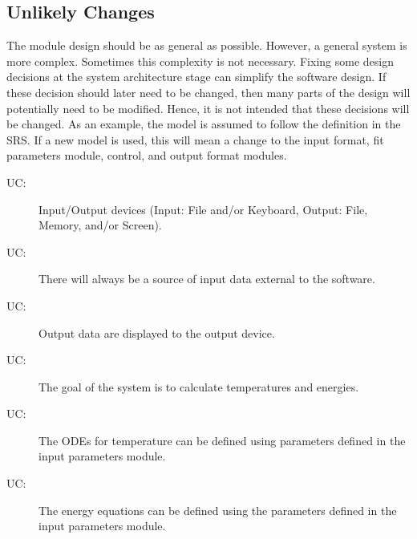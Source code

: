 \documentclass[12pt]{article}
\newcounter{ucnum}
\newcommand{\uctheucnum}{UC\theucnum}
\begin{document}
\subsection{Unlikely Changes}
\label{Sec:UnliChan}
The module design should be as general as possible. However, a general system is more complex. Sometimes this complexity is not necessary. Fixing some design decisions at the system architecture stage can simplify the software design. If these decision should later need to be changed, then many parts of the design will potentially need to be modified. Hence, it is not intended that these decisions will be changed.  As an example, the model is assumed to follow the definition in the SRS.  If a new model is used, this will mean a change to the input format, fit parameters module, control, and output format modules.
\begin{description}
\item[\uctheucnum\label{UCIO}:]Input/Output devices (Input: File and/or Keyboard, Output: File, Memory, and/or Screen).
\end{description}
\begin{description}
\item[\uctheucnum\label{UCinputsource}:]There will always be a source of input data external to the software.
\end{description}
\begin{description}
\item[\uctheucnum\label{UCoutput}:]Output data are displayed to the output device.
\end{description}
\begin{description}
\item[\uctheucnum\label{UCgoal}:]The goal of the system is to calculate temperatures and energies.
\end{description}
\begin{description}
\item[\uctheucnum\label{UCodes}:]The ODEs for temperature can be defined using parameters defined in the input parameters module.
\end{description}
\begin{description}
\item[\uctheucnum\label{UCenergy}:]The energy equations can be defined using the parameters defined in the input parameters module.
\end{description}
\end{document}
